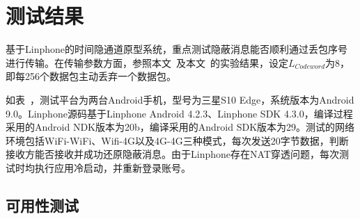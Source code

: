 \section{测试结果}
\label{chap:linphone:result}

基于Linphone的时间隐通道原型系统，重点测试隐蔽消息能否顺利通过丢包序号进行传输。在传输参数方面，参照本文\ 及本文\ 的实验结果，设定$L_{Codeword}$为8，即每256个数据包主动丢弃一个数据包。


如表\ ，测试平台为两台Android手机，型号为三星S10 Edge，系统版本为Android 9.0。Linphone源码基于Linphone Android 4.2.3、Linphone SDK 4.3.0，编译过程采用的Android NDK版本为20b，编译采用的Android SDK版本为29。测试的网络环境包括WiFi-WiFi、Wifi-4G以及4G-4G三种模式，每次发送20字节数据，判断接收方能否接收并成功还原隐蔽消息。由于Linphone存在NAT穿透问题，每次测试时均执行应用冷启动，并重新登录账号。

\subsection{可用性测试}
\label{chap:linphone:result:availablity}

